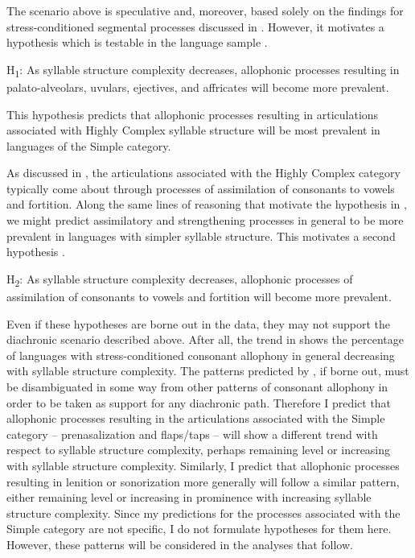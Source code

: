   The scenario above is speculative and, moreover, based solely on the findings for stress-conditioned segmental processes discussed in . However, it motivates a hypothesis which is testable in the language sample .

\ea\label{ex:7.1}
  H\textsubscript{1}: As syllable structure complexity decreases, allophonic processes resulting in palato-alveolars, uvulars, ejectives, and affricates will become more prevalent.
\z

This hypothesis predicts that allophonic processes resulting in articulations associated with Highly Complex syllable structure will be most prevalent in languages of the Simple category.

  As discussed in , the articulations associated with the Highly Complex category typically come about through processes of assimilation of consonants to vowels and fortition. Along the same lines of reasoning that motivate the hypothesis in , we might predict assimilatory and strengthening processes in general to be more prevalent in languages with simpler syllable structure. This motivates a second hypothesis .

\ea\label{ex:7.2}
  H\textsubscript{2}: As syllable structure complexity decreases, allophonic processes of assimilation of consonants to vowels and fortition will become more prevalent.
\z

  Even if these hypotheses are borne out in the data, they may not support the diachronic scenario described above. After all, the trend in  shows the percentage of languages with stress-conditioned consonant allophony in general decreasing with syllable structure complexity. The patterns predicted by , if borne out, must be disambiguated in some way from other patterns of consonant allophony in order to be taken as support for any diachronic path. Therefore I predict that allophonic processes resulting in the articulations associated with the Simple category -- prenasalization and flaps/taps -- will show a different trend with respect to syllable structure complexity, perhaps remaining level or increasing with syllable structure complexity. Similarly, I predict that allophonic processes resulting in lenition or sonorization more generally will follow a similar pattern, either remaining level or increasing in prominence with increasing syllable structure complexity. Since my predictions for the processes associated with the Simple category are not specific, I do not formulate hypotheses for them here. However, these patterns will be considered in the analyses that follow.

